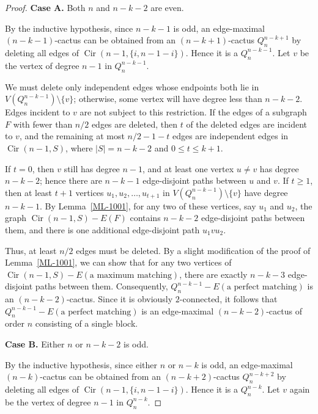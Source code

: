 \documentclass{article}
\begin{document}
\begin{proof}
{\bf Case A.} Both \(n\) and \(n-k-2\) are even.

By the inductive hypothesis, since \(n-k-1\) is odd, an edge-maximal \((n-k-1)\)-cactus can be obtained from an \((n-k+1)\)-cactus \(Q_n^{n-k+1}\) by deleting all edges of \(\operatorname{Cir}(n-1,\{i,n-1-i\})\). Hence it is a \(Q_n^{n-k-1}\). Let \(v\) be the vertex of degree \(n-1\) in \(Q_n^{n-k-1}\).

We must delete only independent edges whose endpoints both lie in \(V(Q_n^{n-k-1})\setminus\{v\}\); otherwise, some vertex will have degree less than \(n-k-2\). Edges incident to \(v\) are not subject to this restriction. If the edges of a subgraph \(F\) with fewer than \(n/2\) edges are deleted, then \(t\) of the deleted edges are incident to \(v\), and the remaining at most \(n/2-1-t\) edges are independent edges in \(\operatorname{Cir}(n-1,S)\), where \(|S|=n-k-2\) and \(0\le t\le k+1\).

If \(t=0\), then \(v\) still has degree \(n-1\), and at least one vertex \(u\neq v\) has degree \(n-k-2\); hence there are \(n-k-1\) edge-disjoint paths between \(u\) and \(v\). If \(t\ge 1\), then at least \(t+1\) vertices \(u_1,u_2,\dots,u_{t+1}\) in \(V(Q_n^{n-k-1})\setminus\{v\}\) have degree \(n-k-1\). By Lemma~\ref{ML-1001}, for any two of these vertices, say \(u_1\) and \(u_2\), the graph \(\operatorname{Cir}(n-1,S)-E(F)\) contains \(n-k-2\) edge-disjoint paths between them, and there is one additional edge-disjoint path \(u_1vu_2\).

Thus, at least \(n/2\) edges must be deleted. By a slight modification of the proof of Lemma~\ref{ML-1001}, we can show that for any two vertices of \(\operatorname{Cir}(n-1,S)-E(\text{a maximum matching})\), there are exactly \(n-k-3\) edge-disjoint paths between them. Consequently, \(Q_n^{n-k-1} - E(\text{a perfect matching})\) is an \((n-k-2)\)-cactus. Since it is obviously \(2\)-connected, it follows that \(Q_n^{n-k-1} - E(\text{a perfect matching})\) is an edge-maximal \((n-k-2)\)-cactus of order \(n\) consisting of a single block.

{\bf Case B.} Either \(n\) or \(n-k-2\) is odd.

By the inductive hypothesis, since either \(n\) or \(n-k\) is odd, an edge-maximal \((n-k)\)-cactus can be obtained from an \((n-k+2)\)-cactus \(Q_n^{n-k+2}\) by deleting all edges of \(\operatorname{Cir}(n-1,\{i,n-1-i\})\). Hence it is a \(Q_n^{n-k}\). Let \(v\) again be the vertex of degree \(n-1\) in \(Q_n^{n-k}\).


\end{proof}
\end{document}
